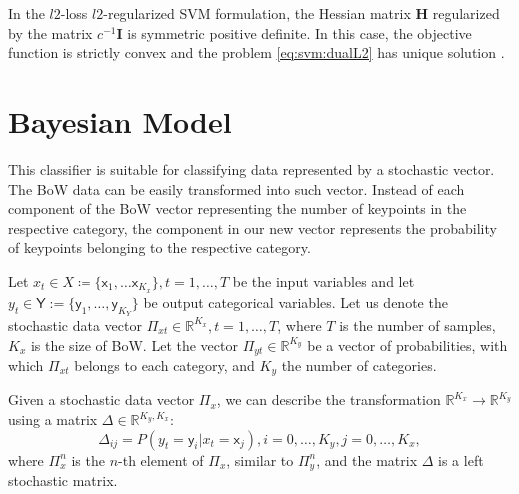 \documentclass{aip-cp}
\begin{document}
In the $l2$-loss $l2$-regularized SVM formulation, the Hessian matrix $\boldsymbol{H}$ regularized by the matrix $c^{-1}\boldsymbol{I}$ is symmetric positive definite. In this case, the objective function is strictly convex and the problem \eqref{eq:svm:dualL2} has unique solution \cite{DosBOOK-2009}.

\section{Bayesian Model}
This classifier is suitable for classifying data represented by a stochastic vector. The BoW data can be easily transformed into such vector. Instead of each component of the BoW vector representing the number of keypoints in the respective category, the component in our new vector represents the probability of keypoints belonging to the respective category.

Let $x_t \in X \coloneqq \lbrace \mathsf{x}_1, \dots \mathsf{x}_{K_x} \rbrace, t = 1,\dots,T$ be the input variables and let $y_t \in \mathsf{Y} := \lbrace \mathsf{y}_1, \dots, \mathsf{y}_{K_Y} \rbrace$ be output categorical variables.
Let us denote the stochastic data vector $\Pi_{xt} \in \mathbb{R}^{K_x}, t=1,\dots,T$, where $T$ is the number of samples, $K_x$ is the size of BoW. Let the vector $\Pi_{yt}\in \mathbb{R}^{K_y}$ be a vector of probabilities, with which $\Pi_{xt}$ belongs to each category, and $K_y$ the number of categories.

Given a stochastic data vector $\Pi_x$, we can describe the transformation $\mathbb{R}^{K_x} \rightarrow \mathbb{R}^{K_y}$ using a matrix $\Delta \in \mathbb{R}^{K_y, K_x}$:
\begin{equation}
    \Delta_{ij} = P(y_t = \mathsf{y}_i | x_t = \mathsf{x}_j), i = 0, \dots, K_y, j = 0, \dots, K_x,
\end{equation}
where $\Pi_x^n$ is the $n$-th element of $\Pi_x$, similar to $\Pi_y^n$, and the matrix $\Delta$ is a left stochastic matrix.
\end{document}

